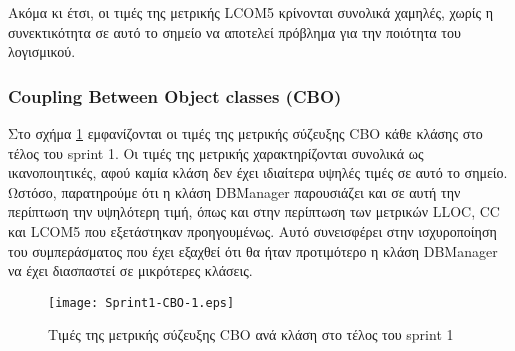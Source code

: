 Ακόμα κι έτσι, οι τιμές της μετρικής LCOM5 κρίνονται συνολικά χαμηλές,
χωρίς η συνεκτικότητα σε αυτό το σημείο να αποτελεί πρόβλημα για την
ποιότητα του λογισμικού.

\subsubsection{Coupling Between Object classes (CBO)}
\label{section:sprint1CBO}

Στο σχήμα \ref{fig:sprint1CBO} εμφανίζονται οι τιμές της μετρικής
σύζευξης CBO κάθε κλάσης στο τέλος του sprint 1. Οι τιμές της μετρικής
χαρακτηρίζονται συνολικά ως ικανοποιητικές, αφού καμία κλάση δεν έχει
ιδιαίτερα υψηλές τιμές σε αυτό το σημείο. Ωστόσο, παρατηρούμε ότι η
κλάση DBManager παρουσιάζει και σε αυτή την περίπτωση την υψηλότερη
τιμή, όπως και στην περίπτωση των μετρικών LLOC, CC και LCOM5 που
εξετάστηκαν προηγουμένως. Αυτό συνεισφέρει στην ισχυροποίηση του
συμπεράσματος που έχει εξαχθεί ότι θα ήταν προτιμότερο η κλάση DBManager
να έχει διασπαστεί σε μικρότερες κλάσεις.

\begin{figure}
\centering
\texttt{[image: Sprint1-CBO-1.eps]}
\caption{Τιμές της μετρικής σύζευξης CBO ανά κλάση στο τέλος του sprint 1}
\label{fig:sprint1CBO}
\end{figure}
